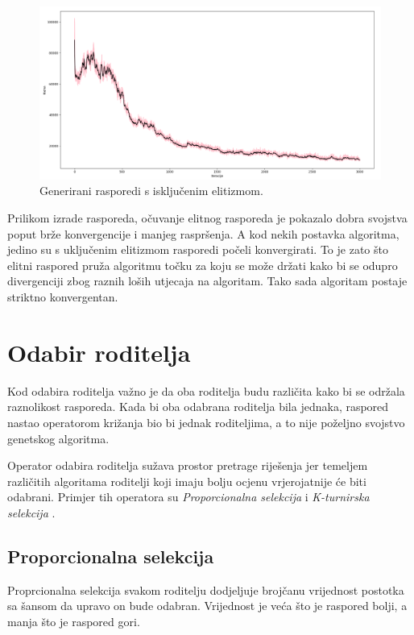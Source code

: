 \documentclass[times, utf8, zavrsni]{fer}
\begin{document}
\begin{figure}[htb]
\centering
\includegraphics[width=14cm]{images/elitizam_ne.png}
\caption{Generirani rasporedi s isključenim elitizmom.}
\label{fig:elitiziam_ne}
\end{figure}

Prilikom izrade rasporeda, očuvanje elitnog rasporeda je pokazalo dobra svojstva poput brže konvergencije i manjeg raspršenja. A kod nekih postavka algoritma, jedino su s uključenim elitizmom rasporedi počeli konvergirati. To je zato što elitni raspored pruža algoritmu točku za koju se može držati kako bi se odupro divergenciji zbog raznih loših utjecaja na algoritam. Tako sada algoritam postaje striktno konvergentan.

\section{Odabir roditelja}

Kod odabira roditelja važno je da oba roditelja budu različita kako bi se održala raznolikost rasporeda. Kada bi oba odabrana roditelja bila jednaka, raspored nastao operatorom križanja bio bi jednak roditeljima, a to nije poželjno svojstvo genetskog algoritma.

Operator odabira roditelja sužava prostor pretrage riješenja jer temeljem različitih algoritama roditelji koji imaju bolju ocjenu vrjerojatnije će biti odabrani. Primjer tih operatora su \emph{Proporcionalna selekcija}  i \emph{K-turnirska selekcija} .

\subsection{Proporcionalna selekcija}

Proprcionalna selekcija svakom roditelju dodjeljuje brojčanu vrijednost postotka sa šansom da upravo on bude odabran. Vrijednost je veća što je raspored bolji, a manja što je raspored gori.
\end{document}
